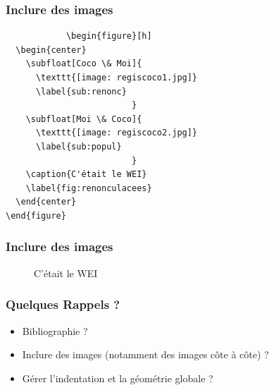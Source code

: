 \documentclass[handout]{beamer}
\begin{document}
	\begin{frame}[fragile=singleslide]
		\frametitle{Inclure des images}

		\begin{verbatim}
			\begin{figure}[h]
  \begin{center}
	\subfloat[Coco \& Moi]{
	  \texttt{[image: regiscoco1.jpg]}
	  \label{sub:renonc}
						 }
	\subfloat[Moi \& Coco]{
	  \texttt{[image: regiscoco2.jpg]}
	  \label{sub:popul}
						 }
	\caption{C'était le WEI}
	\label{fig:renonculacees}
  \end{center}
\end{figure}
		\end{verbatim}

	\end{frame}

	\begin{frame}
		\frametitle{Inclure des images}

		\begin{figure}[h]
\begin{center}
\caption{C'était le WEI}
\label{fig:renonculacees}
\end{center}
\end{figure}
	\end{frame}

	\begin{frame}
		\frametitle{Quelques Rappels ?}
		\begin{itemize}
			\item Bibliographie ?
			\item Inclure des images (notamment des images côte à côte) ?
			\item Gérer l'indentation et la géométrie globale ?
		\end{itemize}
	\end{frame}
\end{document}
